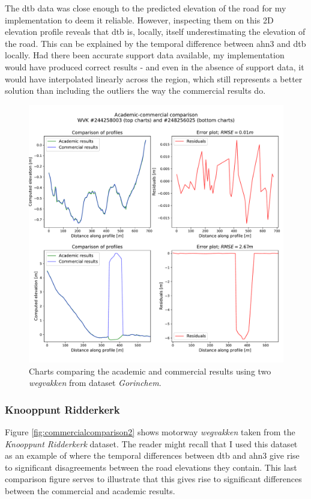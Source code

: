 The \ac{dtb} data was close enough to the predicted elevation of the road for my implementation to deem it reliable. However, inspecting them on this 2D elevation profile reveals that \ac{dtb} is, locally, itself underestimating the elevation of the road. This can be explained by the temporal difference between \ac{ahn3} and \ac{dtb} locally. Had there been accurate support data available, my implementation would have produced correct results - and even in the absence of support data, it would have interpolated linearly across the region, which still represents a better solution than including the outliers the way the commercial results do.

\begin{figure}
    \centering
    \includegraphics[width=0.87\linewidth]{final_report/figs/commercialcomparison1.pdf}
    \caption{Charts comparing the academic and commercial results using two \textit{wegvakken} from dataset \textit{Gorinchem}.}
    \label{fig:commercialcomparison1}
\end{figure}

\subsubsection{Knooppunt Ridderkerk}

Figure \ref{fig:commercialcomparison2} shows motorway \textit{wegvakken} taken from the \textit{Knooppunt Ridderkerk} dataset. The reader might recall that I used this dataset as an example of where the temporal differences between \ac{dtb} and \ac{ahn3} give rise to significant disagreements between the road elevations they contain. This last comparison figure serves to illustrate that this gives rise to significant differences between the commercial and academic results.

